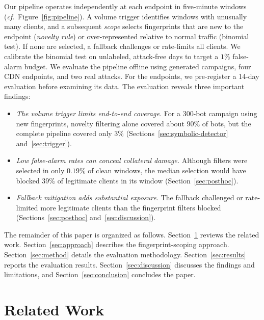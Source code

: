 \documentclass[conference,letterpaper,10pt]{IEEEtran}
\newcommand{\cf}{\textit{c}\textit{f}.\ }
\newcommand\1{\textit{(i)}}
\newcommand\2{\textit{(ii)}}
\newcommand\3{\textit{(iii)}}
\newcommand\4{\textit{(iv)}}
\newcommand\5{\textit{(v)}}
\newcommand\6{\textit{(vi)}}
\newcommand\7{\textit{(vii)}}
\newcommand\8{\textit{(viii)}}
\newcommand\9{\textit{(ix)}}
\begin{document}
Our pipeline operates independently at each endpoint in five-minute windows (\cf Figure~\ref{fig:pipeline}). A volume trigger identifies windows with unusually many clients, and a subsequent \textit{scope} selects fingerprints that are new to the endpoint (\textit{novelty rule}) or over-represented relative to normal traffic (binomial test). If none are selected, a fallback challenges or rate-limits all clients. We calibrate the binomial test on unlabeled, attack-free days to target a $1\%$ false-alarm budget. We evaluate the pipeline offline using generated campaigns, four CDN endpoints, and two real attacks. For the endpoints, we pre-register a 14-day evaluation before examining its data. The evaluation reveals three important findings:

\begin{itemize}
    \item \textit{The volume trigger limits end-to-end coverage.}
    For a 300-bot campaign using new fingerprints, novelty filtering alone covered about $90\%$ of bots, but the complete pipeline covered only $3\%$ (Sections~\ref{sec:symbolic-detector} and~\ref{sec:trigger}).

    \item \textit{Low false-alarm rates can conceal collateral damage.}
    Although filters were selected in only $0.19\%$ of clean windows, the median selection would have blocked $39\%$ of legitimate clients in its window (Section~\ref{sec:posthoc}).

    \item \textit{Fallback mitigation adds substantial exposure.}
    The fallback challenged or rate-limited more legitimate clients than the fingerprint filters blocked (Sections~\ref{sec:posthoc} and~\ref{sec:discussion}).
\end{itemize}

The remainder of this paper is organized as follows.
Section~\ref{sec:rw} reviews the related work. Section~\ref{sec:approach} describes the fingerprint-scoping approach. Section~\ref{sec:method} details the evaluation methodology. Section~\ref{sec:results} reports the evaluation results. Section~\ref{sec:discussion} discusses the findings and limitations, and Section~\ref{sec:conclusion} concludes the paper.

\section{Related Work}
\label{sec:rw}
\end{document}

